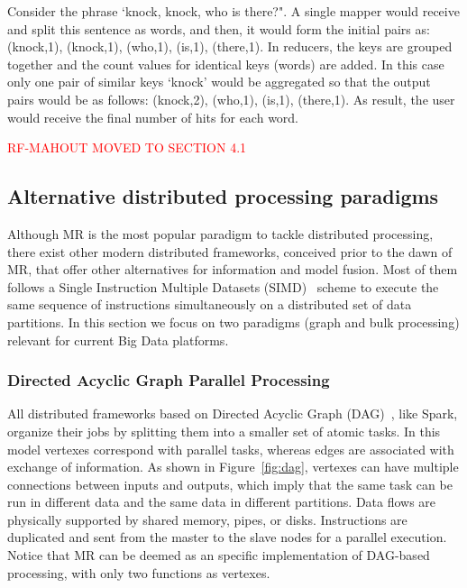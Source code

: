 \documentclass[3p,review]{elsarticle}
\begin{document}
	Consider the phrase `knock, knock, who is there?". A single mapper would receive and split this sentence as words, and then, it would form the initial pairs as: (knock,1), (knock,1), (who,1), (is,1), (there,1). In reducers, the keys are grouped together and the count values for identical keys (words) are added. In this case only one pair of similar keys `knock' would be aggregated so that the output pairs would be as follows: (knock,2), (who,1), (is,1), (there,1). As result, the user would receive the final number of hits for each word. 
	
	\textcolor{red}{RF-MAHOUT MOVED TO SECTION 4.1}
	
	
	\subsection{Alternative distributed processing paradigms}\label{subsec:altMR}
	
	Although MR is the most popular paradigm to tackle distributed processing, there exist other modern distributed frameworks, conceived prior to the dawn of MR, that offer other alternatives for information and model fusion. Most of them follows a Single Instruction Multiple Datasets (SIMD)~\cite{sung00} scheme to execute the same sequence of instructions simultaneously on a distributed set of data partitions. In this section we focus on two paradigms (graph and bulk processing) relevant for current Big Data platforms.
	
	\subsubsection{Directed Acyclic Graph Parallel Processing}
	
	All distributed frameworks based on Directed Acyclic Graph (DAG)~\cite{zaman13}, like Spark, organize their jobs by splitting them into a smaller set of atomic tasks. In this model vertexes correspond with parallel tasks, whereas edges are associated with exchange of information. As shown in Figure~\ref{fig:dag}, vertexes can have multiple connections between inputs and outputs, which imply that the same task can be run in different data and the same data in different partitions. Data flows are physically supported by shared memory, pipes, or disks. Instructions are duplicated and sent from the master to the slave nodes for a parallel execution. Notice that MR can be deemed as an specific implementation of DAG-based processing, with only two functions as vertexes. 
	
\end{document}
